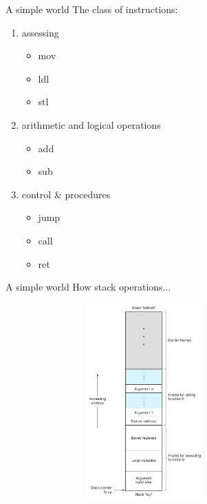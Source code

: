 \documentclass[UKenglish]{beamer}
\begin{document}
\begin{frame}{A simple world}
  The class of instructions:
  \begin{enumerate}
  \item assessing
    \begin{itemize}
    \item mov
    \item ldl
    \item stl
    \end{itemize}
  \item arithmetic and logical operations
    \begin{itemize}
  \item add
  \item sub
    \end{itemize}
  \item control \& procedures
    \begin{itemize}
  \item jump
  \item call
  \item ret
    \end{itemize}
  \end{enumerate}
\end{frame}

\begin{frame}{A simple world}
  How stack operations...
  \begin{center}
    \includegraphics[width = 0.8\textwidth, height=7.5cm]{stack.png}
  \end{center}
\end{frame}
\end{document}
